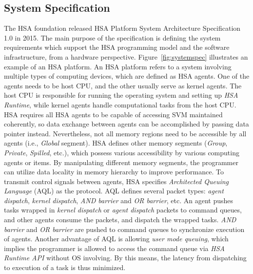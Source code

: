         \subsection{System Specification}
        The HSA foundation released HSA Platform System Architecture Specification 1.0 \cite{systemspec} in 2015.
        The main purpose of the specification is defining the system requirements which support the HSA programming model and the software infrastructure, from a hardware perspective.
        Figure~\ref{fig:systemspec} illustrates an example of an HSA platform.
        An HSA platform refers to a system involving multiple types of computing devices, 
        which are defined as HSA agents.
        One of the agents needs to be host CPU, and the other usually serve as kernel agents. 
        The host CPU is responsible for running the operating system and setting up \textit{HSA Runtime},
        while kernel agents handle computational tasks from the host CPU.
        HSA requires all HSA agents to be capable of accessing SVM maintained coherently, 
        so data exchange between agents can be accomplished by passing data pointer instead.
        Nevertheless, not all memory regions need to be accessible by all agents (i.e., \textit{Global} segment).
        HSA defines other memory segments (\textit{Group}, \textit{Private}, \textit{Spilled}, etc.), 
        which possess various accessibility by various computing agents or items.
        By manipulating different memory segments, the programmer can utilize data locality in memory hierarchy to improve performance.
        To transmit control signals between agents, HSA specifies \textit{Architected Queuing Language} (AQL) as the protocol. 
        AQL defines several packet types: \textit{agent dispatch}, \textit{kernel dispatch}, \textit{AND barrier} and \textit{OR barrier}, etc.
        An agent pushes tasks wrapped in \textit{kernel dispatch} or \textit{agent dispatch} packets to command queues, 
        and other agents consume the packets, and dispatch the wrapped tasks.
        \textit{AND barrier} and \textit{OR barrier} are pushed to command queues to synchronize execution of agents.
        Another advantage of AQL is allowing \textit{user mode queuing},
        which implies the programmer is allowed to access the command queue via \textit{HSA Runtime API} without OS involving.
        By this means, the latency from dispatching to execution of a task is thus minimized.
        \vspace{\textfig}
